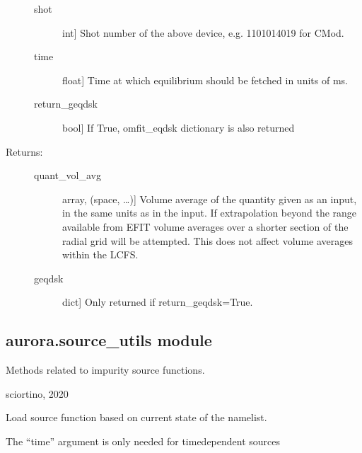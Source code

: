 \documentclass[letterpaper,10pt,english]{sphinxmanual}
\begin{document}
\begin{fulllineitems}
\begin{description}
\begin{description}
\item[{shot}] \leavevmode{[}int{]}
Shot number of the above device, e.g. 1101014019 for C\sphinxhyphen{}Mod.

\item[{time}] \leavevmode{[}float{]}
Time at which equilibrium should be fetched in units of ms.

\item[{return\_geqdsk}] \leavevmode{[}bool{]}
If True, omfit\_eqdsk dictionary is also returned

\end{description}

\item[{Returns:}] \leavevmode\begin{description}
\item[{quant\_vol\_avg}] \leavevmode{[}array, (space, …){]}
Volume average of the quantity given as an input, in the same units as in the input.
If extrapolation beyond the range available from EFIT volume averages over a shorter section
of the radial grid will be attempted. This does not affect volume averages within the LCFS.

\item[{geqdsk}] \leavevmode{[}dict{]}
Only returned if return\_geqdsk=True.

\end{description}

\end{description}

\end{fulllineitems}



\subsection{aurora.source\_utils module}
\label{\detokenize{aurora:module-aurora.source_utils}}\label{\detokenize{aurora:aurora-source-utils-module}}
Methods related to impurity source functions.

sciortino, 2020

\begin{fulllineitems}
\label{\detokenize{aurora:aurora.source_utils.get_aurora_source}}
Load source function based on current state of the namelist.

The “time” argument is only needed for time\sphinxhyphen{}dependent sources

\end{fulllineitems}
\end{document}
